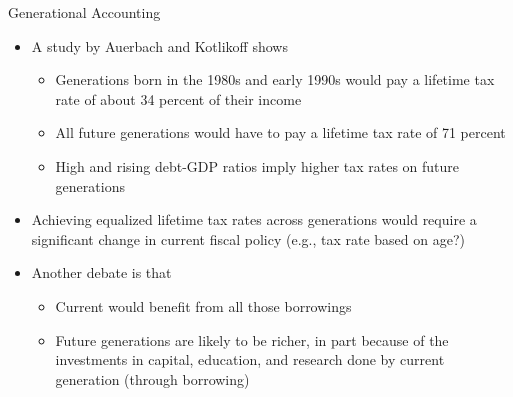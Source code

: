 \documentclass[aspectratio=1610]{beamer}
\begin{document}
\begin{frame}[wide]{Generational Accounting}
	\begin{itemize}
		\item A study by Auerbach and Kotlikoff shows
		\vspace{2mm}
		\begin{itemize}
			\item Generations born in the 1980s and early 1990s would pay a lifetime tax rate of about 34 percent of their income
			\item All future generations would have to pay a lifetime tax rate of 71 percent
			\item High and rising debt-GDP ratios imply higher tax rates on future generations
		\end{itemize}
		\vspace{5mm}
		\item Achieving equalized lifetime tax rates across generations would require a significant change in current fiscal policy (e.g., tax rate based on age?)
		\vspace{5mm}
		\item Another debate is that 
		\vspace{2mm}
		\begin{itemize}
			\item Current would benefit from all those borrowings
			\item Future generations are likely to be richer, in part because of the investments in capital, education, and research done by current generation (through borrowing)
		\end{itemize}
	\end{itemize}
\end{frame}
\end{document}
